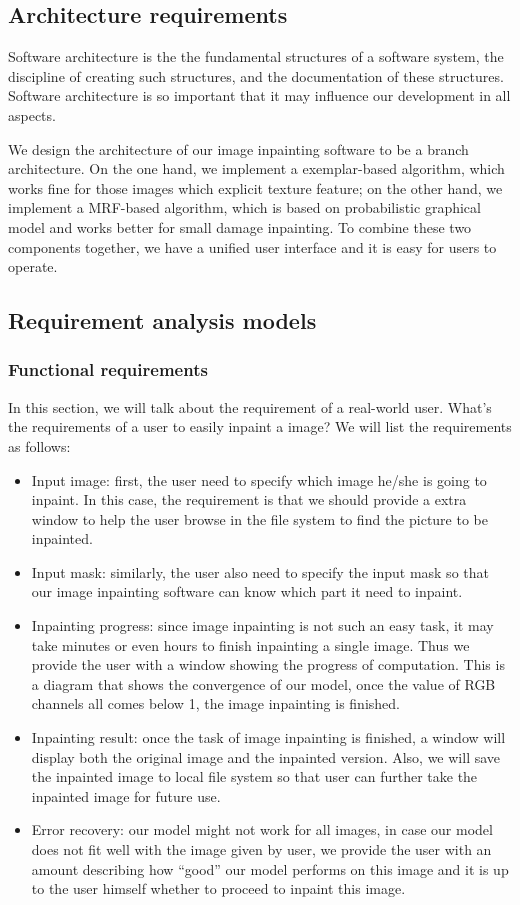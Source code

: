 \subsection{Architecture requirements}
Software architecture is the  the fundamental structures of a software system, the discipline of creating such structures, and the documentation of these structures. Software architecture is so important that it may influence our development in all aspects.

We design the architecture of our image inpainting software to be a branch architecture. On the one hand, we implement a exemplar-based algorithm, which works fine for those images which explicit texture feature; on the other hand, we implement a MRF-based algorithm, which is based on probabilistic graphical model and works better for small damage inpainting. To combine these two components together, we have a unified user interface and it is easy for users to operate.

\subsection{Requirement analysis models}
\subsubsection{Functional requirements}
In this section, we will talk about the requirement of a real-world user. What's the requirements of a user to easily inpaint a image? We will list the requirements as follows:
\begin{itemize}
\item Input image: first, the user need to specify which image he/she is going to inpaint. In this case, the requirement is that we should provide a extra window to help the user browse in the file system to find the picture to be inpainted.
\item Input mask: similarly, the user also need to specify the input mask so that our image inpainting software can know which part it need to inpaint.
\item Inpainting progress: since image inpainting is not such an easy task, it may take minutes or even hours to finish inpainting a single image. Thus we provide the user with a window showing the progress of computation. This is a diagram that shows the convergence of our model, once the value of RGB channels all comes below 1, the image inpainting is finished.
\item Inpainting result: once the task of image inpainting is finished, a window will display both the original image and the inpainted version. Also, we will save the inpainted image to local file system so that user can further take the inpainted image for future use.
\item Error recovery: our model might not work for all images, in case our model does not fit well with the image given by user, we provide the user with an amount describing how ``good'' our model performs on this image and it is up to the user himself whether to proceed to inpaint this image.
\end{itemize}
